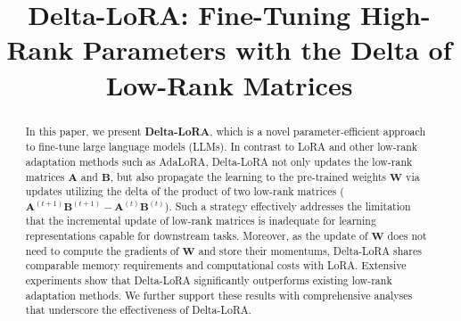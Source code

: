 \title{Delta-LoRA: Fine-Tuning High-Rank Parameters with the Delta of Low-Rank Matrices}

\begin{abstract}
In this paper, we present \textbf{Delta-LoRA}, which is a novel parameter-efficient approach to fine-tune large language models (LLMs). In contrast to LoRA and other low-rank adaptation methods such as AdaLoRA, Delta-LoRA not only updates the low-rank matrices $\boldsymbol{A}$ and $\boldsymbol{B}$, but also propagate the learning to the pre-trained weights $\boldsymbol{W}$ via updates utilizing the delta of the product of two low-rank matrices ($\boldsymbol{A}^{(t+1)}\boldsymbol{B}^{(t+1)} - \boldsymbol{A}^{(t)}\boldsymbol{B}^{(t)}$). Such a strategy effectively addresses the limitation that the incremental update of low-rank matrices is inadequate for learning representations capable for downstream tasks. Moreover, as the update of $\boldsymbol{W}$ does not need to compute the gradients of $\boldsymbol{W}$ and store their momentums, Delta-LoRA shares comparable memory requirements and computational costs with LoRA. Extensive experiments show that Delta-LoRA significantly outperforms existing low-rank adaptation methods. We further support these results with comprehensive analyses that underscore the effectiveness of Delta-LoRA.
\end{abstract}

